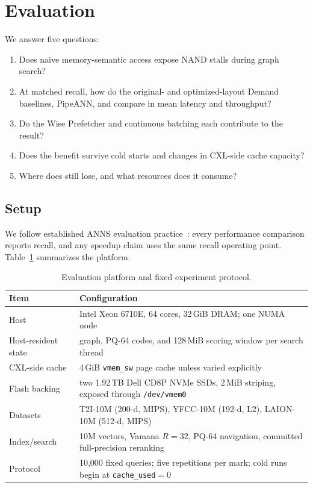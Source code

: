 \section{Evaluation}
\label{sec:eval}

We answer five questions:

\begin{enumerate}
  \item[\textbf{Q1}] Does naive memory-semantic access expose NAND stalls during graph search?
  \item[\textbf{Q2}] At matched recall, how do the original- and optimized-layout Demand baselines, PipeANN, and \sys{} compare in mean latency and throughput?
  \item[\textbf{Q3}] Do the Wise Prefetcher and continuous batching each contribute to the result?
  \item[\textbf{Q4}] Does the benefit survive cold starts and changes in CXL-side cache capacity?
  \item[\textbf{Q5}] Where does \sys{} still lose, and what resources does it consume?
\end{enumerate}

\subsection{Setup}
\label{sec:eval-setup}

We follow established ANNS evaluation practice~\cite{annbench,bigannchallenge}:
every performance comparison reports recall, and any speedup claim uses the
same recall operating point. Table~\ref{tab:setup} summarizes the platform.

\begin{table}[t]
  \caption{Evaluation platform and fixed experiment protocol.}
  \label{tab:setup}
  \small
  \begin{tabular}{@{}p{}p{}@{}}
    \toprule
    Item & Configuration \\
    \midrule
    Host & Intel Xeon 6710E, 64 cores, 32\,GiB DRAM; one NUMA node \\
    Host-resident state & graph, PQ-64 codes, and 128\,MiB scoring window per search thread \\
    CXL-side cache & 4\,GiB \texttt{vmem\_sw} page cache unless varied explicitly \\
    Flash backing & two 1.92\,TB Dell CD8P NVMe SSDs, 2\,MiB striping, exposed through \texttt{/dev/vmem0} \\
    Datasets & T2I-10M (200-d, MIPS), YFCC-10M (192-d, L2), LAION-10M (512-d, MIPS) \\
    Index/search & 10M vectors, Vamana $R{=}32$, PQ-64 navigation, committed full-precision reranking \\
    Protocol & 10,000 fixed queries; five repetitions per mark; cold runs begin at \texttt{cache\_used}${}=0$ \\
    \bottomrule
  \end{tabular}
\end{table}

